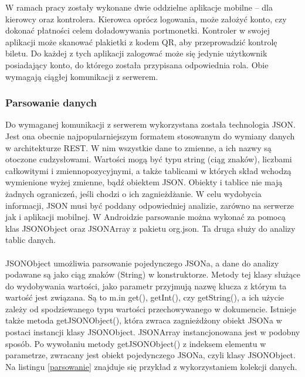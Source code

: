 W ramach pracy zostały wykonane dwie oddzielne aplikacje mobilne -- dla kierowcy oraz kontrolera. Kierowca oprócz logowania, może założyć konto, czy dokonać płatności celem doładowywania portmonetki. Kontroler w swojej aplikacji może skanować plakietki z kodem QR, aby przeprowadzić kontrolę biletu. Do każdej z tych aplikacji zalogować może się jedynie użytkownik posiadający konto, do którego została przypisana odpowiednia rola. Obie wymagają ciągłej komunikacji z serwerem.

\subsubsection*{Parsowanie danych}

Do wymaganej komunikacji z serwerem wykorzystana została technologia JSON. Jest ona obecnie najpopularniejszym formatem stosowanym do wymiany danych w architekturze REST. W nim wszystkie dane to zmienne, a ich nazwy są otoczone cudzysłowami. Wartości mogą być typu string (ciąg znaków), liczbami całkowitymi i zmiennopozycyjnymi, a także tablicami w których skład wchodzą wymienione wyżej zmienne, bądź obiektem JSON. Obiekty i tablice nie mają żadnych ograniczeń, jeśli chodzi o ich zagnieżdżanie. W celu wydobycia informacji, JSON musi być poddany odpowiedniej analizie, zarówno na serwerze jak i aplikacji mobilnej. W Androidzie parsowanie można wykonać za pomocą klas JSONObject oraz JSONArray z pakietu org.json. Ta druga służy do analizy tablic danych. 
\\
\\
JSONObject umożliwia parsowanie pojedynczego JSONa, a dane do analizy podawane są jako ciąg znaków (String) w konstruktorze. Metody tej klasy służące do wydobywania wartości, jako parametr przyjmują nazwę klucza z którym ta wartość jest związana. Są to m.in get(), getInt(), czy getString(), a ich użycie zależy od spodziewanego typu wartości przechowywanego w dokumencie. Istnieje także metoda getJSONObject(), która zwraca zagnieżdżony obiekt JSONa w postaci instancji klasy JSONObject. JSONArray instancjonowana jest w podobny sposób. Po wywołaniu metody getJSONObject() z indeksem elementu w parametrze, zwracany jest obiekt pojedynczego JSONa, czyli klasy JSONObject. Na listingu \ref{parsowanie} znajduje się przykład z wykorzystaniem kolekcji danych.

\newpage

\begin{singlespace}
	\label{parsowanie}
	\vspace{0.3cm}
	\inputminted[fontsize=\footnotesize]{java}{src/imp/parsowanie-json.java}
\end{singlespace}

